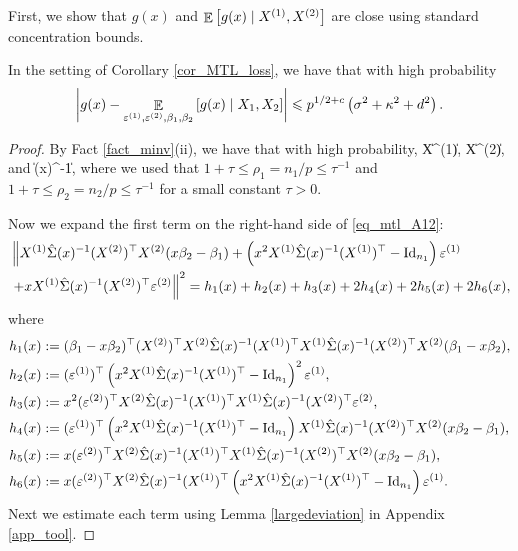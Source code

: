 First, we show that $g(x)$ and $\mathop{\mathbb{E}}\left[ g(x) \mid X^{(1)}, X^{(2)} \right]$ are close using standard concentration bounds.
\begin{claim}\label{claim_largedev1}
 In the setting of Corollary \ref{cor_MTL_loss}, we have that with high probability
$$\left| g(x) - \mathop{\mathbb{E}}_{\varepsilon^{(1)}, \varepsilon^{(2)} ,\beta_1,\beta_2}\left[ g(x) \mid X_1, X_2  \right]\right| \leqslant p^{1/2+c} \left(\sigma^2 + \kappa^2+d^2 \right).$$
 \end{claim}
 \begin{proof}
By Fact \ref{fact_minv}(ii), we have that with high probability,
 \be\label{op_X12}
\|X^{(1)}\|\le {}\lesssim {}, \quad \|X^{(2)}\|\le {}\lesssim {},
 \ee
 and
 \be\label{op_Sig1}
\| \hat\Sigma(x)^{-1}\|\le {}\lesssim {},
 \ee
where we used that $1+\tau\le \rho_1=n_1/p\le \tau^{-1}$ and $1+\tau\le \rho_2=n_2/p\le \tau^{-1}$ for a small constant $\tau>0$.

 Now we expand the first term on the right-hand side of \eqref{eq_mtl_A12}:
 \begin{align}
 & \left\| X^{(1)} \hat\Sigma(x)^{-1} (X^{(2)})^\top X^{(2)} (x\beta_2-\beta_1)+ \left(x^2 X^{(1)}\hat \Sigma(x)^{-1} (X^{(1)})^\top-\operatorname{Id}_{n_1}\right)\varepsilon^{(1)} \right. \nonumber\\
		& \left. + x X^{(1)}\hat \Sigma(x)^{-1} (X^{(2)})^\top \varepsilon^{(2)} \right\|^2=h_1(x) + h_2(x) +h_3(x) + 2h_4(x) + 2h_5(x) + 2h_6(x) ,\label{expand_6}
 \end{align}
 where
 \begin{align*}
&h_1(x):=  (\beta_1-x\beta_2)^\top (X^{(2)})^\top X^{(2)}  \hat\Sigma(x)^{-1}  (X^{(1)})^\top X^{(1)} \hat\Sigma(x)^{-1} (X^{(2)})^\top X^{(2)} (\beta_1-x\beta_2)  ,\\
& h_2(x) := {(\varepsilon^{(1)})^\top \left(x^2 X^{(1)}\hat\Sigma(x)^{-1} (X^{(1)})^\top-\operatorname{Id}_{n_1}\right)^2\varepsilon^{(1)}}  ,\\
& h_3(x):=  x^2 { (\varepsilon^{(2)} )^\top X^{(2)} \hat\Sigma(x)^{-1}  (X^{(1)})^\top X^{(1)}\hat\Sigma(x)^{-1} (X^{(2)})^\top \varepsilon^{(2)}} , \\
& h_4(x):=  (\varepsilon^{(1)})^\top\left(x^2 X^{(1)}\hat\Sigma(x)^{-1} (X^{(1)})^\top-\operatorname{Id}_{n_1}\right) X^{(1)} \hat\Sigma(x)^{-1} (X^{(2)})^\top X^{(2)} (x\beta_2-\beta_1), \\
&h_5(x):=x (\varepsilon^{(2)})^\top X^{(2)}\hat\Sigma(x)^{-1} (X^{(1)})^\top X^{(1)} \hat\Sigma(x)^{-1} (X^{(2)})^\top X^{(2)} (x\beta_2-\beta_1),\\
&h_6(x):=x (\varepsilon^{(2)})^\top X^{(2)}\hat\Sigma(x)^{-1} (X^{(1)})^\top\left(x^2 X^{(1)}\hat\Sigma(x)^{-1} (X^{(1)})^\top-\operatorname{Id}_{n_1}\right)\varepsilon^{(1)}.
\end{align*}
Next we estimate each term using Lemma \ref{largedeviation} in Appendix \ref{app_tool}.


\end{proof}
